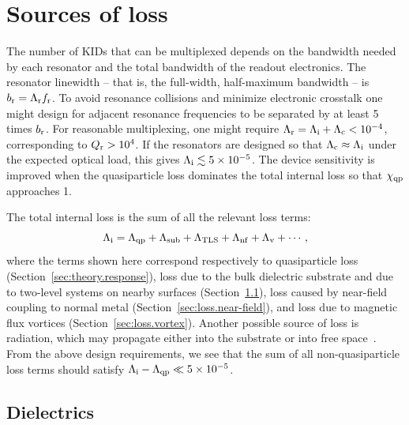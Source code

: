 \chapter{Sources of loss}
\label{chp:loss}

The number of KIDs that can be multiplexed depends on the bandwidth needed by each resonator and the total bandwidth of the readout electronics.
The resonator linewidth -- that is, the full-width, half-maximum bandwidth -- is
$b_{\mathrm{r}} = \Lambda_{\mathrm{r}} f_{\mathrm{r}}$.
To avoid resonance collisions and minimize electronic crosstalk one might design for adjacent resonance frequencies to be separated by at least 5 times $b_{\mathrm{r}}$.
For reasonable multiplexing, one might require
$\Lambda_{\mathrm{r}} = \Lambda_{\mathrm{i}} + \Lambda_{\mathrm{c}} < \num{e-4}$,
corresponding to
$Q_{\mathrm{r}} > \num{e4}$.
If the resonators are designed so that $\Lambda_{\mathrm{c}} \approx \Lambda_{\mathrm{i}}$ under the expected optical load, this gives $\Lambda_{\mathrm{i}} \lesssim \num{5e-5}$.
The device sensitivity is improved when the quasiparticle loss dominates the total internal loss so that $\chi_{\mathrm{qp}}$ approaches 1.

The total internal loss is the sum of all the relevant loss terms:
\begin{equation}
\Lambda_{\mathrm{i}}
  =
  \Lambda_{\mathrm{qp}} +
  \Lambda_{\mathrm{sub}} +
  \Lambda_{\mathrm{TLS}} +
  \Lambda_\mathrm{nf} +
  \Lambda_{\mathrm{v}} +
  \cdots,
\end{equation}
where the terms shown here correspond respectively to quasiparticle loss (Section~\ref{sec:theory.response}), loss due to the bulk dielectric substrate and due to two-level systems on nearby surfaces (Section~\ref{sec:loss.dielectrics}), 
loss caused by near-field coupling to normal metal (Section~\ref{sec:loss.near-field}),
and loss due to magnetic flux vortices (Section~\ref{sec:loss.vortex}).
Another possible source of loss is radiation, which may propagate either into the substrate or into free space~\autocite{Sage2011JAP,Zmuidzinas2012ARCMP}.
From the above design requirements, we see that the sum of all non-quasiparticle loss terms should satisfy
$\Lambda_{\mathrm{i}} - \Lambda_{\mathrm{qp}} \ll \num{5e-5}$.


\section{Dielectrics}
\label{sec:loss.dielectrics}


